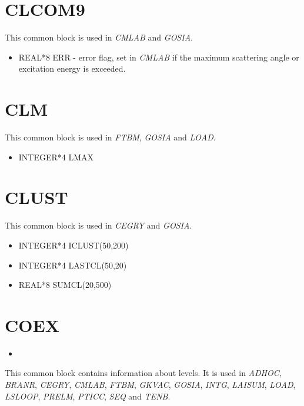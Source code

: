 \section{CLCOM9}

This common block is used in {\em CMLAB} and {\em GOSIA}.

\begin{itemize}
\item REAL*8 ERR - error flag, set in {\em CMLAB} if the maximum scattering
angle or excitation energy is exceeded.
\end{itemize}

\section{CLM}

This common block is used in {\em FTBM}, {\em GOSIA} and {\em LOAD}.

\begin{itemize}
\item INTEGER*4 LMAX
\end{itemize}

\section{CLUST}

This common block is used in {\em CEGRY} and {\em GOSIA}.

\begin{itemize}
\item INTEGER*4 ICLUST(50,200)
\item INTEGER*4 LASTCL(50,20)
\item REAL*8 SUMCL(20,500)
\end{itemize}

\section{COEX}

\begin{itemize}
\item 
\end{itemize}

This common block contains information about levels. It is used in {\em
ADHOC}, {\em BRANR}, {\em CEGRY}, {\em CMLAB}, {\em FTBM}, {\em GKVAC}, {\em
GOSIA}, {\em INTG}, {\em LAISUM}, {\em LOAD}, {\em LSLOOP}, {\em PRELM},
{\em PTICC}, {\em SEQ} and {\em TENB}.

